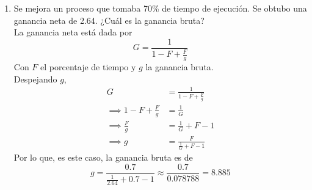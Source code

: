 \documentclass[]{article}
\begin{document}
\begin{enumerate}
{        }
        \item {
            Se mejora un proceso que tomaba 70\% de tiempo de ejecución. Se 
            obtubo una ganancia neta de 2.64. ¿Cuál es la ganancia bruta? \\
            La ganancia neta está dada por 
            \[G = \frac{1}{1-F + \frac{F}{g}}\]
            Con $F$ el porcentaje de tiempo y $g$ la ganancia bruta. \\
            Despejando $g$, 
            \begin{align*}
                G &= \frac{1}{1-F + \frac{F}{g}} \\
                \implies 1-F + \frac{F}{g} &= \frac{1}{G} \\
                \implies  \frac{F}{g} &= \frac{1}{G} + F - 1 \\
                \implies g &= \frac{F}{\frac{1}{G} + F - 1}
            \end{align*}
            Por lo que, es este caso, la ganancia bruta es de 
            \[g = \frac{0.7}{\frac{1}{2.64} + 0.7 - 1} 
            \approx \frac{0.7}{0.078788} = 8.885\]
        }
    \end{enumerate}
\end{document}
